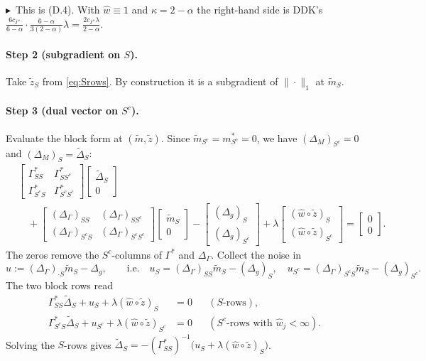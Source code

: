 \documentclass[11pt,a4paper]{article}
\numberwithin{equation}{section}
\theoremstyle{plain}
\theoremstyle{remark}
\newcommand{\changed}{$\blacktriangleright$\ }
\begin{document}
\changed This is (D.4). With $\hat w\equiv1$ and $\kappa=2-\alpha$ the right-hand side is DDK's $\frac{6c_{\Gamma^*}}{6-\alpha}\cdot\frac{6-\alpha}{3(2-\alpha)}\lambda=\frac{2c_{\Gamma^*}\lambda}{2-\alpha}$.

\paragraph{Step 2 (subgradient on $S$).} Take $\tilde z_S$ from \eqref{eq:Srows}. By construction it is a subgradient of $\|\cdot\|_1$ at $\tilde m_S$.

\paragraph{Step 3 (dual vector on $S^c$).} Evaluate the block form at $(\tilde m,\tilde z)$. Since $\tilde m_{S^c}=m^*_{S^c}=0$, we have $(\Delta_M)_{S^c}=0$ and $(\Delta_M)_S=\tilde\Delta_S$:
\begin{align*}
&\begin{bmatrix}\Gamma^*_{SS}&\Gamma^*_{SS^c}\\\Gamma^*_{S^cS}&\Gamma^*_{S^cS^c}\end{bmatrix}
\begin{bmatrix}\tilde\Delta_S\\0\end{bmatrix}\\
&\quad+\begin{bmatrix}(\Delta_\Gamma)_{SS}&(\Delta_\Gamma)_{SS^c}\\(\Delta_\Gamma)_{S^cS}&(\Delta_\Gamma)_{S^cS^c}\end{bmatrix}
\begin{bmatrix}\tilde m_S\\0\end{bmatrix}
-\begin{bmatrix}(\Delta_g)_S\\(\Delta_g)_{S^c}\end{bmatrix}
+\lambda\begin{bmatrix}(\hat w\circ\tilde z)_S\\(\hat w\circ\tilde z)_{S^c}\end{bmatrix}
=\begin{bmatrix}0\\0\end{bmatrix}.
\end{align*}
The zeros remove the $S^c$-columns of $\Gamma^*$ and $\Delta_\Gamma$. Collect the noise in
\[
u:=(\Delta_\Gamma)_{\cdot S}\tilde m_S-\Delta_g,\qquad\text{i.e.}\quad u_S=(\Delta_\Gamma)_{SS}\tilde m_S-(\Delta_g)_S,\quad u_{S^c}=(\Delta_\Gamma)_{S^cS}\tilde m_S-(\Delta_g)_{S^c}.
\]
The two block rows read
\begin{align*}
\Gamma^*_{SS}\tilde\Delta_S+u_S+\lambda(\hat w\circ\tilde z)_S&=0 && (S\text{-rows}),\\
\Gamma^*_{S^cS}\tilde\Delta_S+u_{S^c}+\lambda(\hat w\circ\tilde z)_{S^c}&=0 && (S^c\text{-rows with }\hat w_j<\infty).
\end{align*}
Solving the $S$-rows gives $\tilde\Delta_S=-(\Gamma^*_{SS})^{-1}\big(u_S+\lambda(\hat w\circ\tilde z)_S\big)$. 
\end{document}
